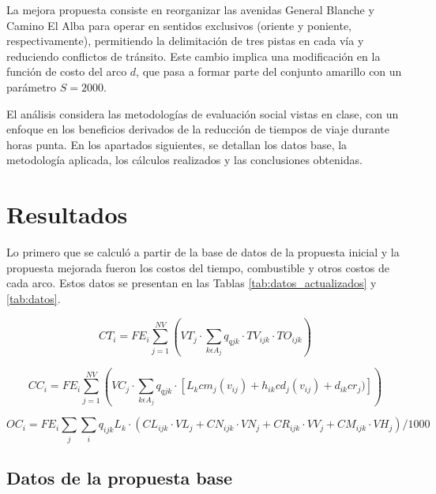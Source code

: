 \documentclass[letterpaper,12pt]{article}
\begin{document}
La mejora propuesta consiste en reorganizar las avenidas General Blanche y Camino El Alba para operar en sentidos exclusivos (oriente y poniente, respectivamente), permitiendo la delimitación de tres pistas en cada vía y reduciendo conflictos de tránsito. Este cambio implica una modificación en la función de costo del arco $d$, que pasa a formar parte del conjunto amarillo con un parámetro $S = 2000$.

El análisis considera las metodologías de evaluación social vistas en clase, con un enfoque en los beneficios derivados de la reducción de tiempos de viaje durante horas punta. En los apartados siguientes, se detallan los datos base, la metodología aplicada, los cálculos realizados y las conclusiones obtenidas.

\newpage
\section{Resultados}

Lo primero que se calculó a partir de la base de datos de la propuesta inicial y la propuesta mejorada fueron los costos del tiempo, combustible y otros costos de cada arco. Estos datos se presentan en las Tablas \ref{tab:datos_actualizados} y \ref{tab:datos}.


\begin{equation}
    CT_i = FE_i \sum_{j=1}^{NV} (VT_j \cdot \sum_{k \epsilon A_j} q_{qjk} \cdot TV_{ijk} \cdot TO_{ijk})
\end{equation}

\begin{equation}
    CC_i = FE_i \sum_{j=1}^{NV} (VC_j \cdot \sum_{k \epsilon A_j} q_{qjk} \cdot [L_k cm_j(v_{ij})+h_{ik} cd_j(v_{ij})+ d_{ik}cr_j)])
\end{equation}

\begin{equation}
    OC_i = FE_i \sum_{j}\sum_{i} q_{ijk} L_k \cdot (CL_{ijk} \cdot VL_j + CN_{ijk} \cdot VN_j + CR_{ijk} \cdot VV_j+ CM_{ijk} \cdot VH_j) /1000
\end{equation}


\subsection{Datos de la propuesta base}
\end{document}
